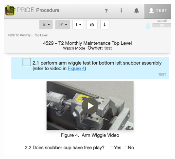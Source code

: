 \documentclass[sigconf]{acmart}
\begin{document}
\begin{figure}[h]
  \centering
    \begin{subfigure}{0.65\linewidth}
    \centering
    \includegraphics[width=\linewidth]{PRIDE-View.png}
    \end{subfigure}
    \begin{subfigure}{0.33\linewidth}
    \centering

\end{subfigure}
\end{figure}
\end{document}
